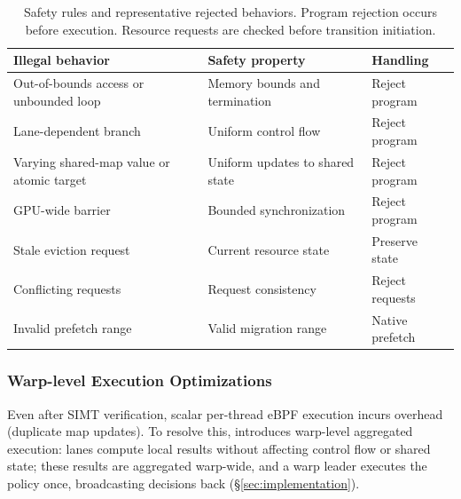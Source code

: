\begin{table}[t]
\centering
\small
\begin{tabularx}{\columnwidth}{@{} >{\hsize=1.2\hsize\raggedright\arraybackslash}X >{\hsize=1.0\hsize\raggedright\arraybackslash}X >{\hsize=0.8\hsize\raggedright\arraybackslash}X @{}}
\toprule
\textbf{Illegal behavior} & \textbf{Safety property} & \textbf{Handling} \\
\midrule
Out-of-bounds access or unbounded loop & Memory bounds and termination & Reject program \\
Lane-dependent branch & Uniform control flow & Reject program \\
Varying shared-map value or atomic target & Uniform updates to shared state & Reject program \\
GPU-wide barrier & Bounded synchronization & Reject program \\
Stale eviction request & Current resource state & Preserve state \\
Conflicting requests & Request consistency & Reject requests \\
Invalid prefetch range & Valid migration range & Native prefetch \\
\bottomrule
\end{tabularx}
\caption{Safety rules and representative rejected behaviors. Program rejection occurs before execution. Resource requests are checked before transition initiation.}
\label{tab:safety-rules}
\end{table}

\subsubsection{Warp-level Execution Optimizations}

Even after SIMT verification, scalar per-thread eBPF execution incurs overhead (\eg duplicate map updates).
To resolve this, \sys{} introduces warp-level aggregated execution: lanes compute local results without affecting control flow or shared state; these results are aggregated warp-wide, and a warp leader executes the policy once, broadcasting decisions back (\S\ref{sec:implementation}).

